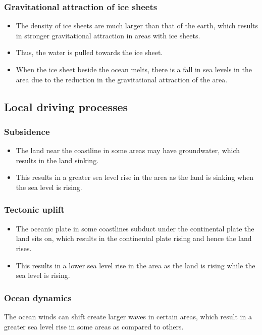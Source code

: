 \documentclass[11pt]{article}
\begin{document}
\newpage

\subsubsection{Gravitational attraction of ice sheets}
\label{sec:orgeb42e24}
\begin{itemize}
\item The density of ice sheets are much larger than that of the earth, which results in stronger gravitational attraction in areas with ice sheets.
\item Thus, the water is pulled towards the ice sheet.
\item When the ice sheet beside the ocean melts, there is a fall in sea levels in the area due to the reduction in the gravitational attraction of the area.
\end{itemize}

\subsection{Local driving processes}
\label{sec:org0652df2}

\subsubsection{Subsidence}
\label{sec:org151f3b4}
\begin{itemize}
\item The land near the coastline in some areas may have groundwater, which results in the land sinking.
\item This results in a greater sea level rise in the area as the land is sinking when the sea level is rising.
\end{itemize}

\subsubsection{Tectonic uplift}
\label{sec:orga389671}
\begin{itemize}
\item The oceanic plate in some coastlines subduct under the continental plate the land sits on, which results in the continental plate rising and hence the land rises.
\item This results in a lower sea level rise in the area as the land is rising while the sea level is rising.
\end{itemize}

\subsubsection{Ocean dynamics}
\label{sec:org234e577}
The ocean winds can shift create larger waves in certain areas, which result in a greater sea level rise in some areas as compared to others.
\end{document}
